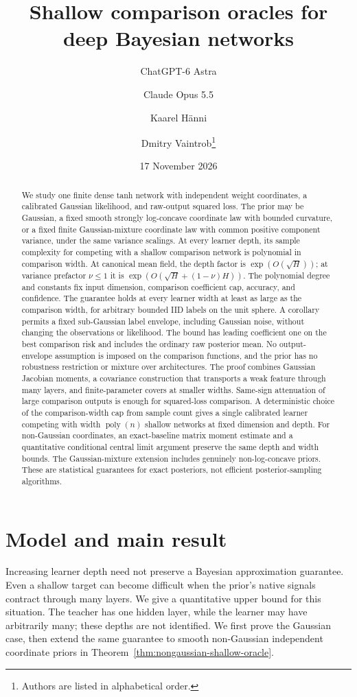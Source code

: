\documentclass[11pt]{article}
\title{Shallow comparison oracles for\\deep Bayesian networks}
\author{ChatGPT-6 Astra \and Claude Opus 5.5 \and Kaarel H\"anni \and Dmitry Vaintrob\thanks{Authors are listed in alphabetical order.}}
\date{17 November 2026}
\begin{document}
\maketitle
\begin{abstract}
We study one finite dense tanh network with independent weight coordinates, a calibrated Gaussian likelihood, and raw-output squared loss. The prior may be Gaussian, a fixed smooth strongly log-concave coordinate law with bounded curvature, or a fixed finite Gaussian-mixture coordinate law with common positive component variance, under the same variance scalings. At every learner depth, its sample complexity for competing with a shallow comparison network is polynomial in comparison width. At canonical mean field, the depth factor is $\exp(O(\sqrt H))$; at variance prefactor $\nu\le1$ it is $\exp(O(\sqrt H+(1-\nu)H))$. The polynomial degree and constants fix input dimension, comparison coefficient cap, accuracy, and confidence. The guarantee holds at every learner width at least as large as the comparison width, for arbitrary bounded IID labels on the unit sphere. A corollary permits a fixed sub-Gaussian label envelope, including Gaussian noise, without changing the observations or likelihood. The bound has leading coefficient one on the best comparison risk and includes the ordinary raw posterior mean. No output-envelope assumption is imposed on the comparison functions, and the prior has no robustness restriction or mixture over architectures. The proof combines Gaussian Jacobian moments, a covariance construction that transports a weak feature through many layers, and finite-parameter covers at smaller widths. Same-sign attenuation of large comparison outputs is enough for squared-loss comparison. A deterministic choice of the comparison-width cap from sample count gives a single calibrated learner competing with width $\operatorname{poly}(n)$ shallow networks at fixed dimension and depth. For non-Gaussian coordinates, an exact-baseline matrix moment estimate and a quantitative conditional central limit argument preserve the same depth and width bounds. The Gaussian-mixture extension includes genuinely non-log-concave priors. These are statistical guarantees for exact posteriors, not efficient posterior-sampling algorithms.
\end{abstract}

\section{Model and main result}
Increasing learner depth need not preserve a Bayesian approximation guarantee. Even a shallow target can become difficult when the prior's native signals contract through many layers. We give a quantitative upper bound for this situation. The teacher has one hidden layer, while the learner may have arbitrarily many; these depths are not identified. We first prove the Gaussian case, then extend the same guarantee to smooth non-Gaussian independent coordinate priors in Theorem~\ref{thm:nongaussian-shallow-oracle}.
\end{document}

